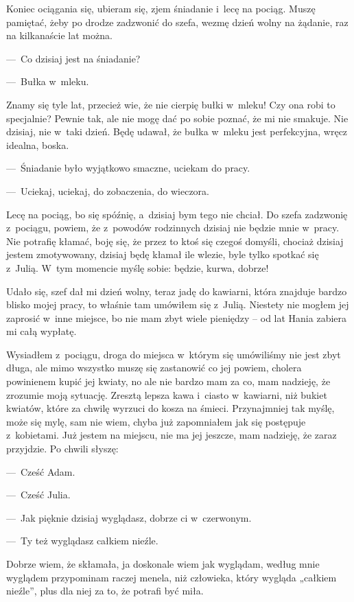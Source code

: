 Koniec ociągania się, ubieram się, zjem śniadanie i~lecę na pociąg. Muszę pamiętać, żeby po drodze zadzwonić do szefa, wezmę dzień wolny na żądanie, raz na kilkanaście lat można.

---~Co dzisiaj jest na śniadanie?

---~Bułka w~mleku.

Znamy się tyle lat, przecież wie, że nie cierpię bułki w~mleku! Czy ona robi to specjalnie? Pewnie tak, ale nie mogę dać po sobie poznać, że mi nie smakuje. Nie dzisiaj, nie w~taki dzień. Będę udawał, że bułka w~mleku jest perfekcyjna, wręcz idealna, boska.

---~Śniadanie było wyjątkowo smaczne, uciekam do pracy.

---~Uciekaj, uciekaj, do zobaczenia, do wieczora.

Lecę na pociąg, bo się spóźnię, a~dzisiaj bym tego nie chciał. Do szefa zadzwonię z~pociągu, powiem, że z~powodów rodzinnych dzisiaj nie będzie mnie w~pracy. Nie potrafię kłamać, boję się, że przez to ktoś się czegoś domyśli, chociaż dzisiaj jestem zmotywowany, dzisiaj będę kłamał ile wlezie, byle tylko spotkać się z~Julią. W~tym momencie myślę sobie: będzie, kurwa, dobrze!

Udało się, szef dał mi dzień wolny, teraz jadę do kawiarni, która znajduje bardzo blisko mojej pracy, to właśnie tam umówiłem się z~Julią. Niestety nie mogłem jej zaprosić w~inne miejsce, bo nie mam zbyt wiele pieniędzy -- od lat Hania zabiera mi całą wypłatę.

Wysiadłem z~pociągu, droga do miejsca w~którym się umówiliśmy nie jest zbyt długa, ale mimo wszystko muszę się zastanowić co jej powiem, cholera powinienem kupić jej kwiaty, no ale nie bardzo mam za co, mam nadzieję, że zrozumie moją sytuację. Zresztą lepsza kawa i~ciasto w~kawiarni, niż bukiet kwiatów, które za chwilę wyrzuci do kosza na śmieci. Przynajmniej tak myślę, może się mylę, sam nie wiem, chyba już zapomniałem jak się postępuje z~kobietami. Już jestem na miejscu, nie ma jej jeszcze, mam nadzieję, że zaraz przyjdzie. Po chwili słyszę:

---~Cześć Adam.

---~Cześć Julia.

---~Jak pięknie dzisiaj wyglądasz, dobrze ci w~czerwonym.

---~Ty też wyglądasz całkiem nieźle.

Dobrze wiem, że skłamała, ja doskonale wiem jak wyglądam, według mnie wyglądem przypominam raczej menela, niż człowieka, który wygląda „całkiem nieźle”, plus dla niej za to, że potrafi być miła.

